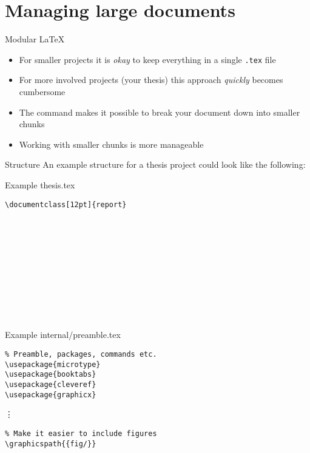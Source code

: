
\section{Managing large documents}

\begin{frame}[fragile]{Modular \LaTeX}
  \begin{itemize}
	  \item For smaller projects it is \emph{okay} to keep everything in a single
      \lstinline|.tex| file
    \item For more involved projects (your thesis) this approach \emph{quickly}
      becomes cumbersome
    \item The \lstinline|| command makes it possible to
      break your document down into smaller chunks
    \item Working with smaller chunks is more manageable 
  \end{itemize}
\end{frame}

\begin{frame}{Structure}
  An example structure for a thesis project could look like the following:
  \\\vspace{0.5cm}
\end{frame}

\begin{frame}[fragile]{Example thesis.tex}
  \begin{lstlisting}
\documentclass[12pt]{report}

 










  \end{lstlisting}
\end{frame}

\begin{frame}[fragile]{Example internal/preamble.tex}
  \begin{lstlisting}
% Preamble, packages, commands etc.
\usepackage{microtype}
\usepackage{booktabs}
\usepackage{cleveref}
\usepackage{graphicx}
  \end{lstlisting}
  \vspace{-0.2cm}\vdots
  \begin{lstlisting}
% Make it easier to include figures 
\graphicspath{{fig/}}
  \end{lstlisting}
\end{frame}

